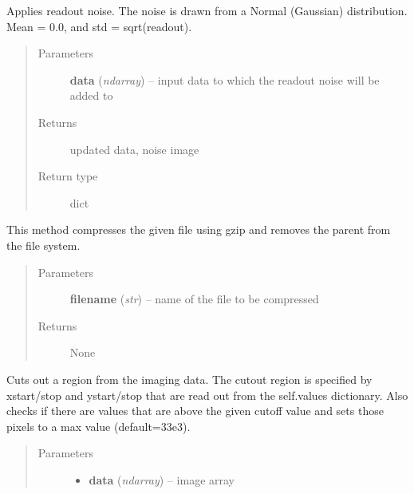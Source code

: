 \documentclass[a4paper,12pt,english]{sphinxmanual}
\begin{document}
\begin{fulllineitems}
\begin{fulllineitems}
\label{postproc:postproc.postprocessing.PostProcessing.applyReadoutNoise}
Applies readout noise. The noise is drawn from a Normal (Gaussian) distribution.
Mean = 0.0, and std = sqrt(readout).
\begin{quote}\begin{description}
\item[{Parameters}] \leavevmode
\textbf{data} (\emph{ndarray}) -- input data to which the readout noise will be added to

\item[{Returns}] \leavevmode
updated data, noise image

\item[{Return type}] \leavevmode
dict

\end{description}\end{quote}

\end{fulllineitems}


\begin{fulllineitems}
\label{postproc:postproc.postprocessing.PostProcessing.compressAndRemoveFile}
This method compresses the given file using gzip and removes the parent from
the file system.
\begin{quote}\begin{description}
\item[{Parameters}] \leavevmode
\textbf{filename} (\emph{str}) -- name of the file to be compressed

\item[{Returns}] \leavevmode
None

\end{description}\end{quote}

\end{fulllineitems}


\begin{fulllineitems}
\label{postproc:postproc.postprocessing.PostProcessing.cutoutRegion}
Cuts out a region from the imaging data. The cutout region is specified by
xstart/stop and ystart/stop that are read out from the self.values dictionary.
Also checks if there are values that are above the given cutoff value and sets
those pixels to a max value (default=33e3).
\begin{quote}\begin{description}
\item[{Parameters}] \leavevmode\begin{itemize}
\item {} 
\textbf{data} (\emph{ndarray}) -- image array


\end{itemize}
\end{description}
\end{quote}
\end{fulllineitems}
\end{fulllineitems}
\end{document}
